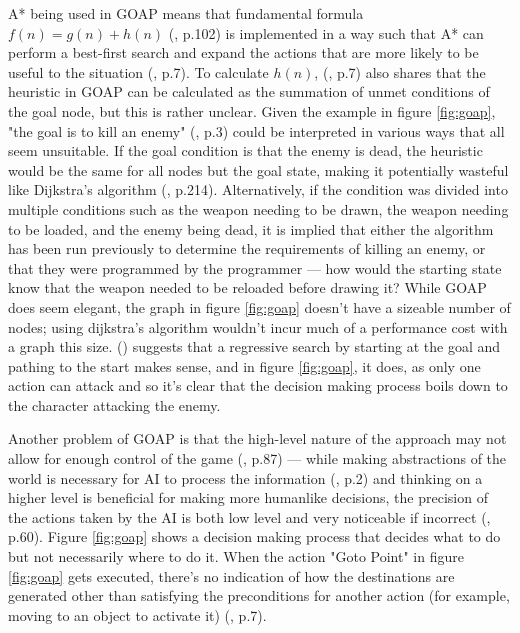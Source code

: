 \documentclass[11pt, a4paper]{article}
\begin{document}
A* being used in GOAP means that fundamental formula $f(n) = g(n) + h(n)$ (\cite{hart1968formal}, p.102) is implemented in a way such that A* can perform a best-first search and expand the actions that are more likely to be  useful to the situation (\cite{orkin2003applying}, p.7). To calculate $h(n)$, \citeauthor{orkin2003applying} (\citeyear{orkin2003applying}, p.7) also shares that the heuristic in GOAP can be calculated as the summation of unmet conditions of the goal node, but this is rather unclear. Given the example in figure \ref{fig:goap}, "the goal is to kill an enemy" (\cite{orkin2003applying}, p.3) could be interpreted in various ways that all seem unsuitable. If the goal condition is that the enemy is dead, the heuristic would be the same for all nodes but the goal state, making it potentially wasteful like Dijkstra's algorithm (\cite{millington2019ai}, p.214). Alternatively, if the condition was divided into multiple conditions such as the weapon needing to be drawn, the weapon needing to be loaded, and the enemy being dead, it is implied that either the algorithm has been run previously to determine the requirements of killing an enemy, or that they were programmed by the programmer --- how would the starting state know that the weapon needed to be reloaded before drawing it? While GOAP does seem elegant, the graph in figure \ref{fig:goap} doesn't have a sizeable number of nodes; using dijkstra's algorithm wouldn't incur much of a performance cost with a graph this size. \citeauthor{orkin2003applying} (\citeyear{orkin2003applying}) suggests that a regressive search by starting at the goal and pathing to the start makes sense, and in figure \ref{fig:goap}, it does, as only one action can attack and so it's clear that the decision making process boils down to the character attacking the enemy.

Another problem of GOAP is that the high-level nature of the approach may not allow for enough control of the game (\cite{stanciu2012implementing}, p.87) --- while making abstractions of the world is necessary for AI to process the information (\cite{buro2004call}, p.2) and thinking on a higher level is beneficial for making more humanlike decisions, the precision of the actions taken by the AI is both low level and very noticeable if incorrect (\cite{graham2003pathfinding}, p.60). Figure \ref{fig:goap} shows a decision making process that decides what to do but not necessarily where to do it. When the action "Goto Point" in figure \ref{fig:goap} gets executed, there's no indication of how the destinations are generated other than satisfying the preconditions for another action (for example, moving to an object to activate it) (\cite{orkin2003applying}, p.7). 
\end{document}

